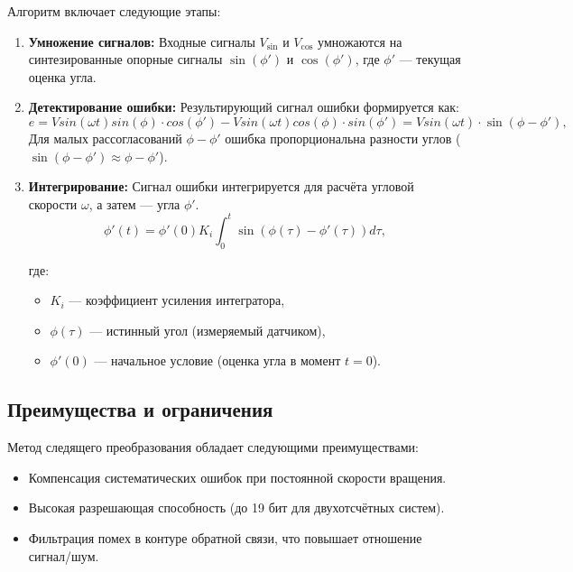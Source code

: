 Алгоритм включает следующие этапы:
\begin{enumerate}
    \item \textbf{Умножение сигналов:} Входные сигналы \( V_{\text{sin}} \) и \( V_{\text{cos}} \) умножаются на синтезированные опорные сигналы \( \sin(\phi') \) и \( \cos(\phi') \), где \( \phi' \) — текущая оценка угла. 
    \item \textbf{Детектирование ошибки:} Результирующий сигнал ошибки формируется как: 
    \begin{equation}
      e = V sin(\omega t) sin(\phi) \cdot cos(\phi') - V sin(\omega t) cos(\phi) \cdot sin(\phi') = V sin(\omega t) \cdot \sin(\phi - \phi'),
      \label{eq:error}
    \end{equation}
    Для малых рассогласований \( \phi - \phi' \) ошибка пропорциональна разности углов ($\sin(\phi - \phi') \approx \phi - \phi'$).
    \item \textbf{Интегрирование:} Сигнал ошибки интегрируется для расчёта угловой скорости \( \omega \), а затем — угла \( \phi' \). 
    \begin{equation}
      \phi'(t) = \phi'(0) K_i \int_0^t \sin\left(\phi(\tau) - \phi'(\tau)\right) d\tau,
      \label{eq:phi_prime}
    \end{equation}
      
      где:
    \begin{itemize}
        \item \(K_i\) — коэффициент усиления интегратора,
        \item \(\phi(\tau)\) — истинный угол (измеряемый датчиком),
        \item \(\phi'(0)\) — начальное условие (оценка угла в момент \(t=0\)).
    \end{itemize}


\end{enumerate}

\subsection{Преимущества и ограничения}
Метод следящего преобразования обладает следующими преимуществами:
\begin{itemize}
    \item Компенсация систематических ошибок при постоянной скорости вращения.
    \item Высокая разрешающая способность (до 19 бит для двухотсчётных систем).
    \item Фильтрация помех в контуре обратной связи, что повышает отношение сигнал/шум.
\end{itemize}


